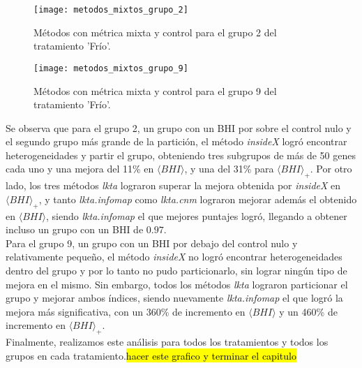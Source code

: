 \begin{figure}[H]
\centering
\texttt{[image: metodos\_mixtos\_grupo\_2]}
\caption{Métodos con métrica mixta y control para el grupo 2 del tratamiento 'Frío'.}
\label{fig:metodos_mixtos_grupo_2}
\end{figure}
\begin{figure}[H]
\centering
\texttt{[image: metodos\_mixtos\_grupo\_9]}
\caption{Métodos con métrica mixta y control para el grupo 9 del tratamiento 'Frío'.}
\label{fig:metodos_mixtos_grupo_9}
\end{figure}
Se observa que para el grupo 2, un grupo con un BHI por sobre el control nulo y el segundo grupo más grande de la partición, el método \textit{insideX} logró encontrar heterogeneidades y partir el grupo, obteniendo tres subgrupos de más de 50 genes cada uno y una mejora del 11\% en $\langle BHI \rangle$, y una del 31\% para $\langle BHI \rangle _{+}$. Por otro lado, los tres métodos \textit{lkta} lograron superar la mejora obtenida por \textit{insideX} en $\langle BHI \rangle _{+}$, y tanto \textit{lkta.infomap} como \textit{lkta.cnm} lograron mejorar además el obtenido en $\langle BHI \rangle$, siendo \textit{lkta.infomap} el que mejores puntajes logró, llegando a obtener incluso un grupo con un BHI de $0.97$.\\
Para el grupo 9, un grupo con un BHI por debajo del control nulo y relativamente pequeño, el método \textit{insideX} no logró encontrar heterogeneidades dentro del grupo y por lo tanto no pudo particionarlo, sin lograr ningún tipo de mejora en el mismo. Sin embargo, todos los métodos \textit{lkta} lograron particionar el grupo y mejorar ambos índices, siendo nuevamente \textit{lkta.infomap} el que logró la mejora más significativa, con un 360\% de incremento en $\langle BHI \rangle$ y un 460\% de incremento en $\langle BHI \rangle _{+}$.\\
Finalmente, realizamos este análisis para todos los tratamientos y todos los grupos en cada tratamiento.\hl{hacer este grafico y terminar el capitulo}




